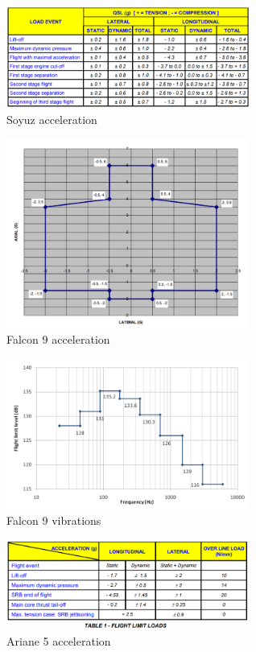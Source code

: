 \begin{figure}[h!]
\centering
\includegraphics[width=8cm]{figures/Soyuz_acce.png}
\caption{Soyuz acceleration}
\label{Soyuz acceleration}
\end{figure}


\begin{figure}[h!]
\centering
\includegraphics[width=8cm]{figures/Falcon9_acc.png}
\caption{Falcon 9 acceleration}
\label{Falcon 9 acceleration}
\end{figure}

\begin{figure}[h!]
\centering
\includegraphics[width=8cm]{figures/Falcon9_vibr.png}
\caption{Falcon 9 vibrations}
\label{Falcon 9 vibrations}
\end{figure}

\clearpage

\begin{figure}[h!]
\centering
\includegraphics[width=8cm]{figures/Ariane5_acc.PNG}
\caption{Ariane 5 acceleration}
\label{Ariane 5 acceleration}
\end{figure}

